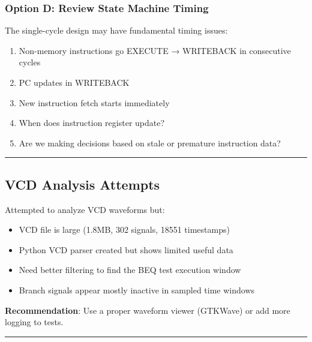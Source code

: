 \subsubsection{Option D: Review State Machine Timing}\label{cr:fix:rtl-debug-report:option-d-review-state-machine-timing}

\begin{record}

The single-cycle design may have fundamental timing issues:

\begin{enumerate}
\def\labelenumi{\arabic{enumi}.}
\tightlist
\item
  Non-memory instructions go EXECUTE → WRITEBACK in consecutive cycles
\item
  PC updates in WRITEBACK
\item
  New instruction fetch starts immediately
\item
  When does instruction register update?
\item
  Are we making decisions based on stale or premature instruction data?
\end{enumerate}

\begin{center}\rule{0.5\linewidth}{0.5pt}\end{center}

\end{record}

\subsection{VCD Analysis Attempts}\label{cr:fix:rtl-debug-report:vcd-analysis-attempts}

\begin{record}

Attempted to analyze VCD waveforms but:

\begin{itemize}
\tightlist
\item
  VCD file is large (1.8MB, 302 signals, 18551 timestamps)
\item
  Python VCD parser created but shows limited useful data
\item
  Need better filtering to find the BEQ test execution window
\item
  Branch signals appear mostly inactive in sampled time windows
\end{itemize}

\textbf{Recommendation}: Use a proper waveform viewer (GTKWave) or add
more logging to tests.

\begin{center}\rule{0.5\linewidth}{0.5pt}\end{center}

\end{record}

